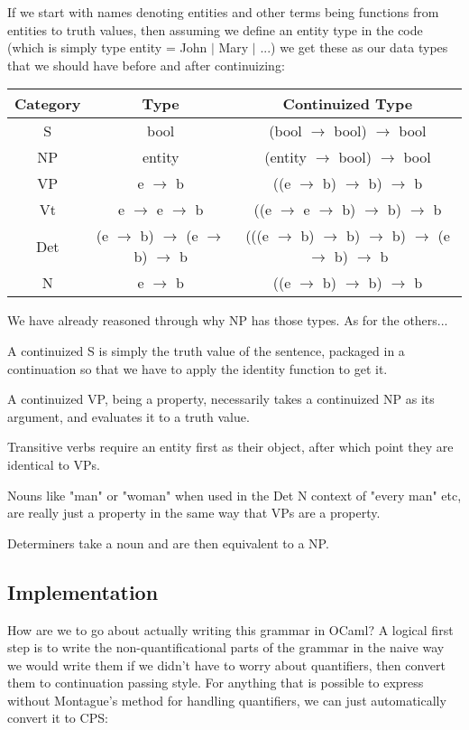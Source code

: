 \documentclass[11pt]{article} %
\begin{document}
If we start with names denoting entities and other terms being functions from entities to truth values, then assuming we define an entity type in the code (which is simply type entity = John $|$ Mary $|$ ...) we get these as our data types that we should have before and after continuizing:
\bigskip

\begin{tabular}{|c|c|c|}
\hline
Category & Type & Continuized Type \\
\hline
S & bool & (bool $\rightarrow$ bool) $\rightarrow$ bool \\
NP & entity & (entity $\rightarrow$ bool) $\rightarrow$ bool \\
VP & e $\rightarrow$ b & ((e $\rightarrow$ b) $\rightarrow$ b) $\rightarrow$ b \\
Vt & e $\rightarrow$ e $\rightarrow$ b & ((e $\rightarrow$ e $\rightarrow$ b) $\rightarrow$ b) $\rightarrow$ b \\
Det & (e $\rightarrow$ b) $\rightarrow$ (e $\rightarrow$ b) $\rightarrow$ b & (((e $\rightarrow$ b) $\rightarrow$ b) $\rightarrow$ b) $\rightarrow$ (e $\rightarrow$ b) $\rightarrow$ b \\
N & e $\rightarrow$ b & ((e $\rightarrow$ b) $\rightarrow$ b) $\rightarrow$ b \\
\hline
\end{tabular}
\bigskip

We have already reasoned through why NP has those types. As for the others...

A continuized S is simply the truth value of the sentence, packaged in a continuation so that we have to apply the identity function to get it.

A continuized VP, being a property, necessarily takes a continuized NP as its argument, and evaluates it to a truth value.

Transitive verbs require an entity first as their object, after which point they are identical to VPs.

Nouns like "man" or "woman" when used in the Det N context of "every man" etc, are really just a property in the same way that VPs are a property.

Determiners take a noun and are then equivalent to a NP.

\subsection{Implementation}

How are we to go about actually writing this grammar in OCaml? A logical first step is to write the non-quantificational parts of the grammar in the naive way we would write them if we didn't have to worry about quantifiers, then convert them to continuation passing style. For anything that is possible to express without Montague's method for handling quantifiers, we can just automatically convert it to CPS:
\end{document}
